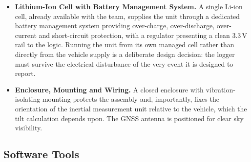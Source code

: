 \documentclass[12pt,a4paper,oneside]{report}
\newcommand{\SI}[2]{#1\,#2}
\begin{document}
\begin{itemize}[leftmargin=*,itemsep=0.6em,topsep=0.6em]
\item \textbf{Lithium-Ion Cell with Battery Management System.} A single Li-ion cell,
already available with the team, supplies the unit through a dedicated battery management
system providing over-charge, over-discharge, over-current and short-circuit protection,
with a regulator presenting a clean \SI{3.3}{V} rail to the logic. Running the unit from its
own managed cell rather than directly from the vehicle supply is a deliberate design
decision: the logger must survive the electrical disturbance of the very event it is
designed to report.

\item \textbf{Enclosure, Mounting and Wiring.} A closed enclosure with vibration-isolating
mounting protects the assembly and, importantly, fixes the orientation of the inertial
measurement unit relative to the vehicle, which the tilt calculation depends upon. The GNSS
antenna is positioned for clear sky visibility.
\end{itemize}

\subsection{Software Tools}
\end{document}
